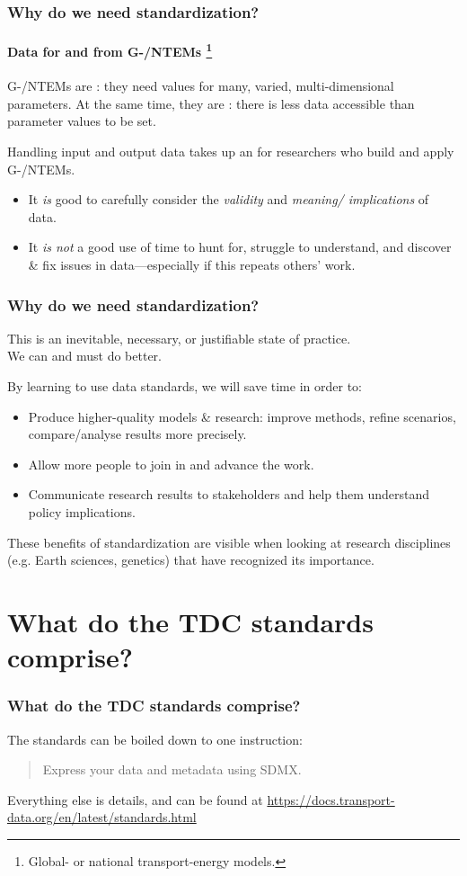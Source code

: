 \documentclass[12pt,aspectratio=169]{beamer}
\begin{document}
\begin{frame}
\frametitle{Why do we need standardization?}
\framesubtitle{Data for and from G-/NTEMs%
\footnote{Global- or national transport-energy models.}}

G-/NTEMs are : they need values for many, varied, multi-dimensional parameters.
At the same time, they are  : there is less data accessible than parameter values to be set.

\bigskip
Handling input and output data takes up an  for researchers who build and apply G-/NTEMs.
\begin{itemize}
  \item It \emph{is} good to carefully consider the \emph{validity} and \emph{meaning/ implications} of data.
  \item It \emph{is not} a good use of time to hunt for, struggle to understand, and discover \& fix issues in data—especially if this repeats others' work.
\end{itemize}

\end{frame}

\begin{frame}
\frametitle{Why do we need standardization?}

This is  an inevitable, necessary, or justifiable state of practice.\\
We can and must do better.

\medskip
By learning to use data standards, we will save time in order to:
\begin{itemize}
  \item Produce higher-quality models \& research: improve methods, refine scenarios, compare/analyse results more precisely.
  \item Allow more people to join in and advance the work.
  \item Communicate research results to stakeholders and help them understand policy implications.
\end{itemize}

\medskip
These benefits of standardization are visible when looking at research disciplines (e.g. Earth sciences, genetics) that have recognized its importance.
\end{frame}

\section{What do the TDC standards comprise?}
\begin{frame}
\frametitle{What do the TDC standards comprise?}

The standards can be boiled down to one instruction:

\medskip
\begin{quote}
   \large Express your data and metadata using SDMX.
\end{quote}

\bigskip
Everything else is details, and can be found at \url{https://docs.transport-data.org/en/latest/standards.html}

\end{frame}
\end{document}
